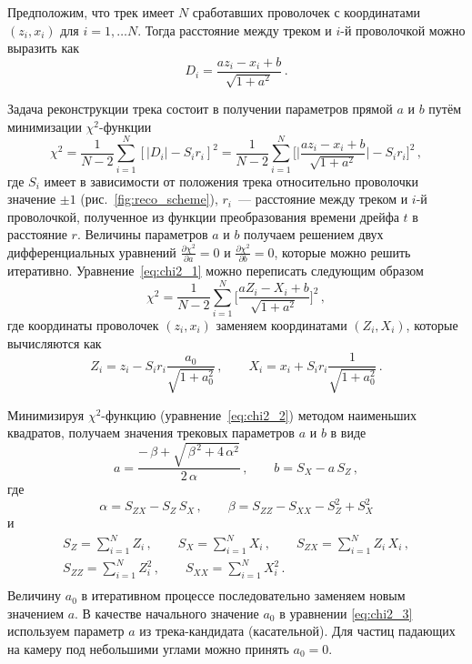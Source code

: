 Предположим, что трек имеет $N$ сработавших проволочек с координатами
$(z_i, x_i)$ для $i = 1, \ldots N$. Тогда расстояние между треком и $i$-й
проволочкой можно выразить как
\begin{equation}
  D_i = \frac{a z_i - x_i + b}{\sqrt{1 + a^{2}}}\,.
\end{equation}

Задача реконструкции трека состоит в получении параметров прямой $a$ и $b$
путём минимизации $\chi^2$-функции
\begin{equation}
  \label{eq:chi2_1}
  \chi^2 = \frac{1}{N-2}\sum_{i=1}^{N} [|D_i| -S_ir_i]^2 =
  \frac{1}{N-2}\sum_{i=1}^{N} \biggl[
    \Big|\frac{az_i - x_i + b}{\sqrt{1 + a^2}}\Big| - S_ir_i\biggr]^2\,,
\end{equation}
где $S_i$ имеет в зависимости от положения трека относительно проволочки
значение $\pm{1}$ (рис.~\ref{fig:reco_scheme}), $r_i$~--- расстояние между
треком и $i$-й проволочкой, полученное из функции преобразования времени дрейфа
$t$ в расстояние $r$. Величины параметров $a$ и $b$ получаем решением двух
дифференциальных уравнений
$\frac{\partial \chi^2}{\partial a} = 0$ и
$\frac{\partial \chi^2}{\partial b} = 0$, которые можно решить итеративно.
Уравнение~\eqref{eq:chi2_1} можно переписать следующим образом
\begin{equation}
  \label{eq:chi2_2}
  \chi^2 = \frac{1}{N-2}\sum_{i=1}^{N}
  \biggl[\frac{aZ_i - X_i + b}{\sqrt{1 + a^2}}\biggr]^2\,,
\end{equation}
где координаты проволочек $(z_i, x_i)$ заменяем координатами $(Z_i, X_i)$,
которые вычисляются как
\begin{equation}
  \label{eq:chi2_3}
  Z_i = z_i - S_ir_i \frac{a_0}{\sqrt{1 + a_0^2}}\,, \qquad
  X_i = x_i + S_ir_i \frac{1}{\sqrt{1 + a_0^2}}\,.
\end{equation}

Минимизируя $\chi^2$-функцию (уравнение~\eqref{eq:chi2_2}) методом наименьших
квадратов, получаем значения трековых параметров $a$ и $b$ в виде
\begin{equation}
  a = \frac{-\,\beta + \sqrt{\,\beta^{\,2} + 4\,\alpha^2}}{2\,\alpha}\,, \qquad
  b = S_X - a\,S_Z\,,
\end{equation}
где
\begin{equation}
  \alpha = S_{ZX} - S_Z\,S_X\,, \qquad
  \beta = S_{ZZ} - S_{XX} - S_Z^2 + S_X^2
\end{equation}
и
\begin{equation}
  \begin{split}
    S_Z = \sum_{i=1}^{N} Z_i\,, \qquad
    S_X = \sum_{i=1}^{N} X_i\,, \qquad
    S_{ZX} = \sum_{i=1}^{N} Z_i \, X_i\,, \\
    S_{ZZ} = \sum_{i=1}^{N} Z_i^2\,, \qquad
    S_{XX} = \sum_{i=1}^{N} X_i^2\,. \qquad \qquad \\
  \end{split}
\end{equation}
Величину $a_0$ в итеративном процессе последовательно заменяем новым значением
$a$. В качестве начального значение $a_0$ в уравнении \eqref{eq:chi2_3}
используем параметр $a$ из трека-кандидата (касательной). Для частиц падающих
на камеру под небольшими углами можно принять $a_0 = 0$.

